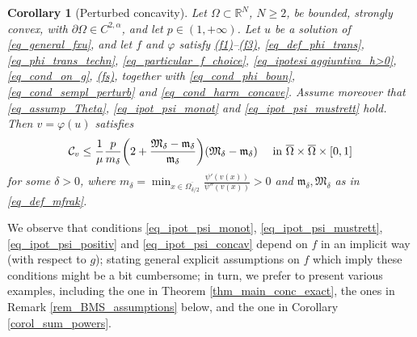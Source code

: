 \documentclass[11pt, reqno]{amsart}
\newtheorem{corollary}[lemma]{Corollary}
\theoremstyle{definition}
\numberwithin{equation}{section}
\newcommand{\R}{\mathbb{R}}
\newcommand{\mc}[1]{\mathcal{#1}}
\begin{document}
\begin{corollary}[Perturbed concavity]
\label{corol_gen_perturb_concav}
Let $\Omega \subset \R^N$, $N\geq 2$, be bounded, strongly convex, with $\partial \Omega \in C^{2,\alpha}$, and let $p\in (1,+\infty)$.
Let $u$ be a solution of \eqref{eq_general_fxu}, and let $f$ and $\varphi$ satisfy 
\hyperlink{(f1)}{\rm{(f1)}}--\hyperlink{(f3)}{\rm{(f3)}},
\eqref{eq_def_phi_trans}, \eqref{eq_phi_trans_techn}, 
\eqref{eq_particular_f_choice}, \eqref{eq_ipotesi aggiuntiva_h>0}, \eqref{eq_cond_on_g}, \hyperlink{(fs)}{\rm{(fs)}}, together with \eqref{eq_cond_phi_boun}, \eqref{eq_cond_sempl_perturb} and \eqref{eq_cond_harm_concave}. 
Assume moreover that \eqref{eq_assump_Theta}, \eqref{eq_ipot_psi_monot} and \eqref{eq_ipot_psi_mustrett} hold. 
Then $v=\varphi(u)$ satisfies 
$$\mc{C}_{v} \leq \frac{1}{\mu} \frac{p}{m_{\delta}} \bigg( 2 + \frac{\mathfrak{M}_{\delta} - \mathfrak{m}_{\delta}}{\mathfrak{m}_{\delta}}\bigg) (\mathfrak{M}_{\delta}-\mathfrak{m}_{\delta}) \quad \hbox{ in $ \overline{\Omega} \times \overline{\Omega} \times [0,1]$}$$
for some $\delta>0$, where
$m_{\delta} = \min_{x \in \overline{\Omega_{\delta/2}} } \frac{\psi'(v(x))}{\psi''(v(x))}>0$ and $\mathfrak{m}_{\delta}, \mathfrak{M}_{\delta}$ as in \eqref{eq_def_mfrak}.
\end{corollary}

We observe that conditions \eqref{eq_ipot_psi_monot}, \eqref{eq_ipot_psi_mustrett}, \eqref{eq_ipot_psi_positiv} and \eqref{eq_ipot_psi_concav} depend on $f$ in an implicit way (with respect to $g$); stating general explicit assumptions on $f$ which imply these conditions might be a bit cumbersome; in turn, we prefer to present various examples, including the one in Theorem \ref{thm_main_conc_exact}, the ones in Remark \ref{rem_BMS_assumptions} below, and the one in Corollary \ref{corol_sum_powers}.
\end{document}
